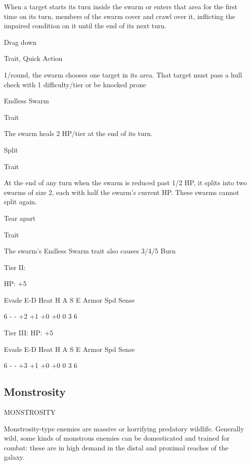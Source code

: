 When a target starts its turn inside the swarm or enters that area for the first time on its turn,  
members of the swarm cover and crawl over it, inflicting the impaired condition on it until the end  
of its next turn.
 

Drag down
 
Trait, Quick Action
 
1/round, the swarm chooses one target in its area. That target must pass a hull check with 1  
difficulty/tier or be knocked prone
 

Endless Swarm
 
Trait
 
The swarm heals 2 HP/tier at the end of its turn.
 

Split
 
Trait
 
At the end of any turn when the swarm is reduced past 1/2 HP, it splits into two swarms of size 2,  
each with half the swarm’s current HP. These swarms cannot split again.
 

Tear apart
 
Trait
 
The swarm’s Endless Swarm trait also causes 3/4/5 Burn
 

Tier II:
 
HP: +5
 

          Evade     E-D     Heat    H     A     S     E        Armor        Spd       Sense 

          6         -       -       +2    +1    +0    +0       0            3         6 

Tier III:  
HP: +5
 

          Evade     E-D     Heat    H     A     S     E        Armor        Spd       Sense 

          6         -       -       +3    +1    +0    +0       0            3         6 

                                                                                                                     
\subsection{Monstrosity}
                                           MONSTROSITY  

Monstrosity-type enemies are massive or horrifying predatory wildlife. Generally wild, some kinds  
of monstrous enemies can be domesticated and trained for combat: these are in high demand in  
the distal and proximal reaches of the galaxy. 
 

